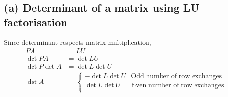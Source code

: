 \documentclass[11pt, oneside]{article}
\begin{document}
\subsection*{(a) Determinant of a matrix using LU factorisation}
  Since determinant respects matrix multiplication,
  \begin{align*}
    PA &= LU \\
    \det {PA} &= \det {LU} \\
    \det{P} \det{A} &= \det{L} \det{U} \\
    \det{A} &=  \begin{cases}
                - \det{L} \det{U} & \text{Odd number of row exchanges} \\
                \det{L} \det{U} & \text{Even number of row exchanges} \\
              \end{cases}
  \end{align*}
\end{document}
